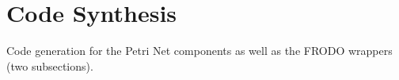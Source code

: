 \section{Code Synthesis}
\label{section:synth}

Code generation for the Petri Net components as well as the FRODO wrappers (two subsections).

